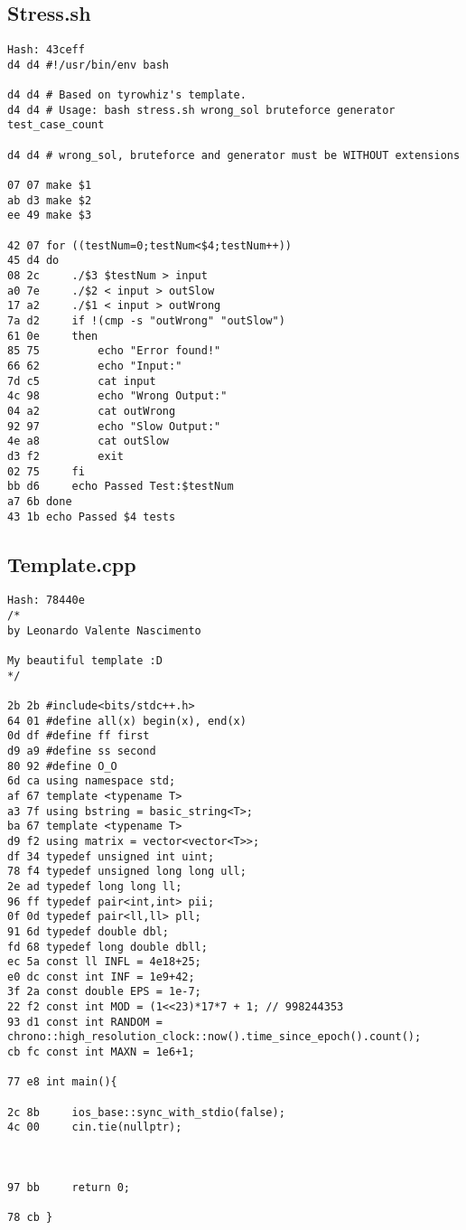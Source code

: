 \documentclass[11pt, a4paper, twoside]{article}
\begin{document}
\subsection{Stress.sh}
\begin{lstlisting}
Hash: 43ceff
d4 d4 #!/usr/bin/env bash

d4 d4 # Based on tyrowhiz's template.
d4 d4 # Usage: bash stress.sh wrong_sol bruteforce generator test_case_count

d4 d4 # wrong_sol, bruteforce and generator must be WITHOUT extensions

07 07 make $1
ab d3 make $2
ee 49 make $3

42 07 for ((testNum=0;testNum<$4;testNum++))
45 d4 do
08 2c     ./$3 $testNum > input
a0 7e     ./$2 < input > outSlow
17 a2     ./$1 < input > outWrong
7a d2     if !(cmp -s "outWrong" "outSlow")
61 0e     then
85 75         echo "Error found!"
66 62         echo "Input:"
7d c5         cat input
4c 98         echo "Wrong Output:"
04 a2         cat outWrong
92 97         echo "Slow Output:"
4e a8         cat outSlow
d3 f2         exit
02 75     fi
bb d6     echo Passed Test:$testNum
a7 6b done
43 1b echo Passed $4 tests
\end{lstlisting}

\subsection{Template.cpp}
\begin{lstlisting}
Hash: 78440e
/*
by Leonardo Valente Nascimento

My beautiful template :D
*/

2b 2b #include<bits/stdc++.h>
64 01 #define all(x) begin(x), end(x)
0d df #define ff first
d9 a9 #define ss second
80 92 #define O_O
6d ca using namespace std;
af 67 template <typename T>
a3 7f using bstring = basic_string<T>;
ba 67 template <typename T>
d9 f2 using matrix = vector<vector<T>>;
df 34 typedef unsigned int uint;
78 f4 typedef unsigned long long ull;
2e ad typedef long long ll;
96 ff typedef pair<int,int> pii;
0f 0d typedef pair<ll,ll> pll;
91 6d typedef double dbl;
fd 68 typedef long double dbll; 
ec 5a const ll INFL = 4e18+25;
e0 dc const int INF = 1e9+42;
3f 2a const double EPS = 1e-7;
22 f2 const int MOD = (1<<23)*17*7 + 1; // 998244353
93 d1 const int RANDOM = chrono::high_resolution_clock::now().time_since_epoch().count();
cb fc const int MAXN = 1e6+1;

77 e8 int main(){
          
2c 8b     ios_base::sync_with_stdio(false);
4c 00     cin.tie(nullptr);
          
          
          
97 bb     return 0;
      
78 cb }
\end{lstlisting}
\end{document}
